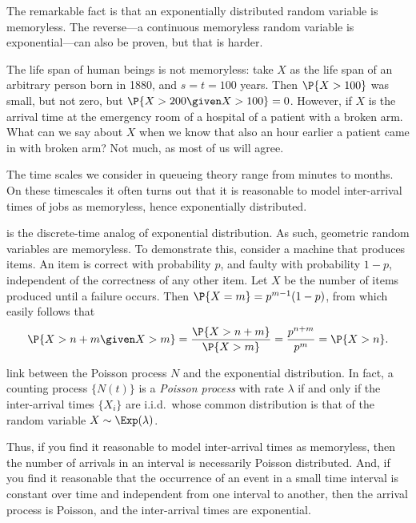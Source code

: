 The remarkable fact is that an exponentially distributed random variable is memoryless.
The reverse---a continuous memoryless random variable is exponential---can also be proven, but that is harder.

The life span of human beings is not memoryless: take $X$ as the life span of an arbitrary person born in 1880, and $s=t = 100$ years.
Then $\P{X>100}$ was small, but not zero, but $\P{X>200 \given X>100} = 0$.
However, if $X$ is the arrival time at the emergency room of a hospital of a patient with a broken arm.
What can we say about $X$ when we know that also an hour earlier a patient came in with broken arm?
Not much, as most of us will agree.

The time scales we consider in queueing theory range from minutes to months.
On these timescales it often turns out that it is reasonable to model inter-arrival times of jobs as memoryless, hence exponentially distributed.


 is the discrete-time analog of exponential distribution.
As such, geometric random variables are memoryless.
To demonstrate this, consider a machine that produces items.
An item is correct with probability $p$, and faulty with probability $1-p$, independent of the correctness of any other item.
Let $X$ be the number of items produced until a failure occurs.  Then $\P{X=m} = p^{m-1} (1-p)$, from which easily follows that
\begin{equation}  \label{eq:81}
\P{X>n+m\given X>m} = \frac{\P{X>n+m}}{\P{X>m}} = \frac{p^{n+m}}{p^m}=\P{X>n}.
\end{equation}


 link between the Poisson process $N$ and the exponential distribution.
In fact, a counting process $\{N(t)\}$ is a \emph{Poisson process} with rate $\lambda$ if and only if the inter-arrival times $\{X_i\}$ are i.i.d.\ whose common distribution is that of the random variable $X\sim \Exp(\lambda)$.


Thus, if you find it reasonable to model inter-arrival times as memoryless, then the number of arrivals in an interval is necessarily Poisson distributed.
And, if you find it reasonable that the occurrence of an event in a small time interval is constant over time and independent from one interval to another, then the arrival process is Poisson, and the inter-arrival times are exponential.




